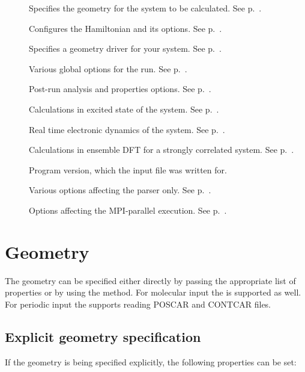 \begin{description}
\item[] Specifies the geometry for the system to be
  calculated.  See p.~.
\item[] Configures the Hamiltonian and its options. See
  p.~.
\item[] Specifies a geometry driver for your system.  See
  p.~.
\item[]  Various global options for the run. See
  p.~.
\item[]  Post-run analysis and properties options. See
  p.~.
\item[] Calculations in excited state of the system.
  See p.~.
\item[] Real time electronic dynamics of the system.  See
  p.~.
\item[] Calculations in ensemble DFT for a strongly correlated system.
  See p.~.
\item[] Program version, which the input file was written for.
\item[] Various options affecting the parser only.
  See p.~.
\item[] Options affecting the MPI-parallel execution. See
  p.~.
\end{description}


\section{Geometry}
\label{sec:dftbp.Geometry}

The geometry can be specified either directly by passing the
appropriate list of properties or by using the 
method.
For molecular input the  is supported as well.
For periodic input the  supports reading POSCAR and CONTCAR files.

\subsection{Explicit geometry specification}

If the geometry is being specified explicitly, the following
properties can be set:

